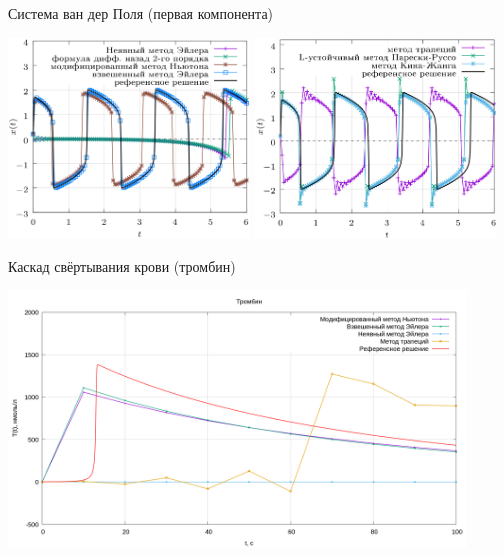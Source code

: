 \documentclass[
    14pt,
    xcolor=dvipsnames,
    aspectratio=169
]{beamer}
\begin{document}
\begin{frame}{Система ван дер Поля (первая компонента)}
    \begin{center}
        \includegraphics[width=0.48\textwidth]{./images/slides/van_der_Pol_1.png}
        \hfill
        \includegraphics[width=0.48\textwidth]{./images/slides/van_der_Pol_2.png}
    \end{center}
\end{frame}

\begin{frame}[c]{Каскад свёртывания крови (тромбин)}
    \begin{center}
        \includegraphics[width=0.91\textwidth]{./images/slides/thrombin.png}
    \end{center}
\end{frame}
\end{document}
